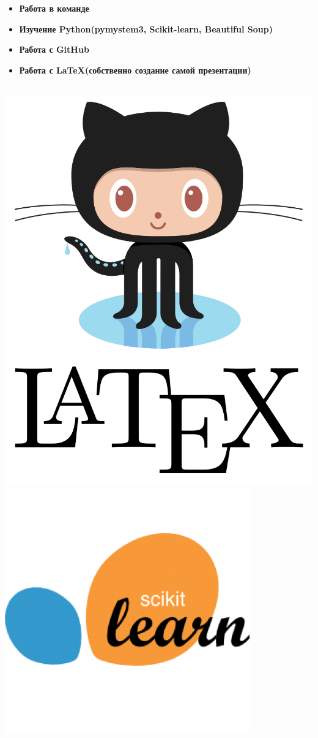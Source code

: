 \documentclass[t]{beamer}
\begin{document}
	
	\begin{frame}
		\frametitle{\insertsection}
		\begin{itemize}
			\item \textbf{Работа в команде}
			\item \textbf{Изучение Python(pymystem3, Scikit-learn, Beautiful Soup)}
			\item \textbf{Работа с GitHub}
			\item \textbf{Работа с \LaTeX (собственно создание самой презентации)}
		\end{itemize}
		~~~~~~~~~
		\includegraphics[scale = 0.08]{images/git_hub.png}
		\includegraphics[scale = 0.08]{images/latex-logo.png}
		\includegraphics[scale = 0.2]{images/scikit_learn.png}

\end{frame}
\end{document}
